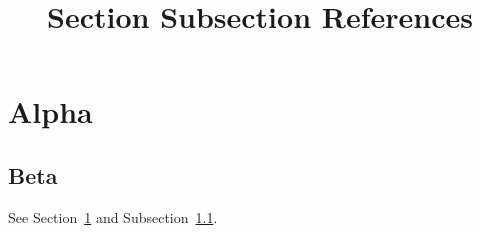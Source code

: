 \documentclass{article}
\begin{document}
\title{Section Subsection References}\maketitle
\section{Alpha}\label{sec:alpha}\subsection{Beta}\label{sub:beta} See Section~\ref{sec:alpha} and Subsection~\ref{sub:beta}.
\end{document}
